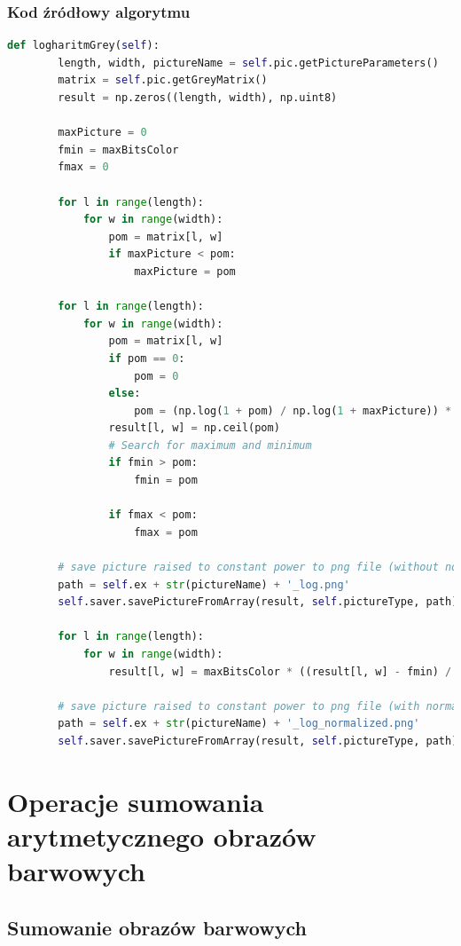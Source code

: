 \documentclass[a4paper,12pt, titlepage]{report}
\begin{document}
\subsection*{Kod źródłowy algorytmu}
\begin{lstlisting}[language=Python]
def logharitmGrey(self):
        length, width, pictureName = self.pic.getPictureParameters()
        matrix = self.pic.getGreyMatrix()
        result = np.zeros((length, width), np.uint8)

        maxPicture = 0
        fmin = maxBitsColor
        fmax = 0

        for l in range(length):
            for w in range(width):
                pom = matrix[l, w]
                if maxPicture < pom:
                    maxPicture = pom

        for l in range(length):
            for w in range(width):
                pom = matrix[l, w]
                if pom == 0:
                    pom = 0
                else:
                    pom = (np.log(1 + pom) / np.log(1 + maxPicture)) * maxBitsColor
                result[l, w] = np.ceil(pom)
                # Search for maximum and minimum
                if fmin > pom:
                    fmin = pom

                if fmax < pom:
                    fmax = pom

        # save picture raised to constant power to png file (without normalization)
        path = self.ex + str(pictureName) + '_log.png'
        self.saver.savePictureFromArray(result, self.pictureType, path)

        for l in range(length):
            for w in range(width):
                result[l, w] = maxBitsColor * ((result[l, w] - fmin) / (fmax - fmin))

        # save picture raised to constant power to png file (with normalization)
        path = self.ex + str(pictureName) + '_log_normalized.png'
        self.saver.savePictureFromArray(result, self.pictureType, path)
\end{lstlisting}

\chapter{Operacje sumowania arytmetycznego obrazów barwowych}

\section{Sumowanie obrazów barwowych}
\end{document}

